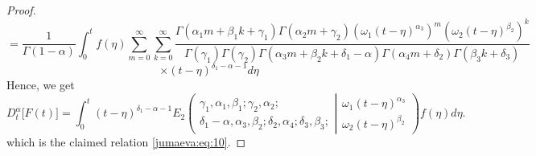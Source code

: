 \documentclass[10pt,a4paper]{amsart}
\begin{document}
\begin{proof}
\begin{equation*}
    =\frac{1}{\Gamma(1-\alpha)} \int_0^t f(\eta) \sum_{m=0}^\infty \sum_{k=0}^\infty \frac{\Gamma(\alpha_1 m+\beta_1 k+\gamma_1)\Gamma(\alpha_2 m+\gamma_2) (\omega_1(t-\eta)^{\alpha_3})^m (\omega_2(t-\eta)^{\beta_2})^k}{\Gamma(\gamma_1)\Gamma(\gamma_2)\Gamma(\alpha_3 m+\beta_2 k+\delta_1-\alpha)\Gamma(\alpha_4 m+\delta_2)\Gamma(\beta_3 k+ \delta_3)}
\end{equation*}
\begin{equation*}
\times    (t-\eta)^{\delta_1-\alpha-1} d\eta
\end{equation*}
Hence, we get 
\begin{equation*}
   D_t^\alpha\big[F(t)\big]=\int_0^t (t-\eta)^{\delta_1-\alpha-1} E_2\left(\begin{array}{c}
\gamma_1,\alpha_1, \beta_1 ; \gamma_2, \alpha_2 ; \\
\delta_1-\alpha, \alpha_3, \beta_2 ;\delta_2, \alpha_4; \delta_3, \beta_3 ; 
\end{array} \left| 
\begin{array}{c}
\omega_1 (t-\eta)^{\alpha_3} \\
\omega_2 (t-\eta)^{\beta_2} 
\end{array} 
\right.
\right) f(\eta) d\eta.
\end{equation*}
which is the claimed relation \eqref{jumaeva:eq:10}.
\end{proof}
\end{document}
